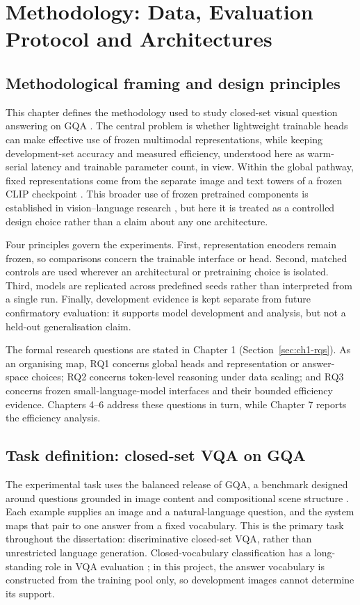 \chapter{Methodology: Data, Evaluation Protocol and Architectures}
\section{Methodological framing and design principles}
\label{sec:ch3-framing}
This chapter defines the methodology used to study closed-set visual question answering on GQA \citep{hudson2019gqa}. The central problem is whether lightweight trainable heads can make effective use of frozen multimodal representations, while keeping development-set accuracy and measured efficiency, understood here as warm-serial latency and trainable parameter count, in view. Within the global pathway, fixed representations come from the separate image and text towers of a frozen CLIP checkpoint \citep{radford2021clip}.
This broader use of frozen pretrained components is established in vision--language research \citep{tsimpoukelli2021frozen}, but here it is treated as a controlled design choice rather than a claim about any one architecture.

Four principles govern the experiments. First, representation encoders remain frozen, so comparisons concern the trainable interface or head. Second, matched controls are used wherever an architectural or pretraining choice is isolated. Third, models are replicated across predefined seeds rather than interpreted from a single run. Finally, development evidence is kept separate from future confirmatory evaluation: it supports model development and analysis, but not a held-out generalisation claim.

The formal research questions are stated in Chapter 1 (Section~\ref{sec:ch1-rqs}).
As an organising map, RQ1 concerns global heads and representation or answer-space choices; RQ2 concerns token-level reasoning under data scaling; and RQ3 concerns frozen small-language-model interfaces and their bounded efficiency evidence. Chapters 4--6 address these questions in turn, while Chapter 7 reports the efficiency analysis.

\section{Task definition: closed-set VQA on GQA}
\label{sec:ch3-task}
The experimental task uses the balanced release of GQA, a benchmark designed around questions grounded in image content and compositional scene structure \citep{hudson2019gqa}. Each example supplies an image and a natural-language question, and the system maps that pair to one answer from a fixed vocabulary. This is the primary task throughout the dissertation: discriminative closed-set VQA, rather than unrestricted language generation. Closed-vocabulary classification has a long-standing role in VQA evaluation \citep{antol2015vqa,jabri2016revisiting}; in this project, the answer vocabulary is constructed from the training pool only, so development images cannot determine its support.

